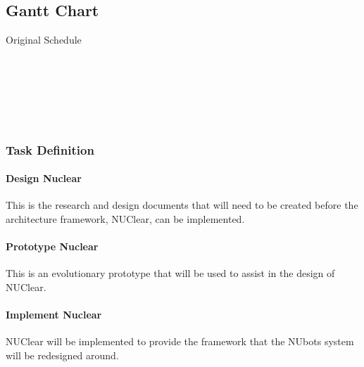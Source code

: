 \documentclass[english,12pt]{scrartcl}
\begin{document}
		\subsection{Gantt Chart}
			Original Schedule
			\begin{figure}[!ht]
				\scalebox{0.8} {
					\begin{ganttchart}[bar/.append style={orange}, link/.append style={thick}]{1}{23}
						 \\
						 \\
						 \\ %
						 \\ %
						 \ganttnewline %
						 \ganttnewline %
						 \ganttnewline %
						 \\ %
						 \ganttnewline %
					\end{ganttchart}
				}
			\end{figure}
			\subsubsection{Task Definition}
				\paragraph{Design Nuclear}
					This is the research and design documents that will need to be created before the architecture framework, NUClear, can be implemented.
				\paragraph{Prototype Nuclear}
					This is an evolutionary prototype that will be used to assist in the design of NUClear.
				\paragraph{Implement Nuclear}
					NUClear will be implemented to provide the framework that the NUbots system will be redesigned around.
\end{document}

